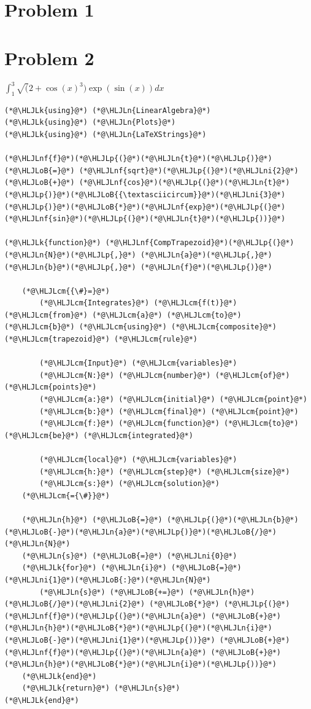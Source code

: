 \documentclass[12pt,a4paper]{article}
\newcommand{\HLJLk}[1]{\textcolor[RGB]{148,91,176}{\textbf{#1}}}
\newcommand{\HLJLn}[1]{#1}
\newcommand{\HLJLnf}[1]{\textcolor[RGB]{66,102,213}{#1}}
\newcommand{\HLJLni}[1]{\textcolor[RGB]{59,151,46}{#1}}
\newcommand{\HLJLoB}[1]{\textcolor[RGB]{102,102,102}{\textbf{#1}}}
\newcommand{\HLJLp}[1]{#1}
\newcommand{\HLJLcm}[1]{\textcolor[RGB]{153,153,119}{\textit{#1}}}
\begin{document}
\section{Problem 1}
\section{Problem 2}
$\int_1^3 \sqrt(2+\cos(x)^3)\exp(\sin(x))dx$


\begin{lstlisting}
(*@\HLJLk{using}@*) (*@\HLJLn{LinearAlgebra}@*)
(*@\HLJLk{using}@*) (*@\HLJLn{Plots}@*)
(*@\HLJLk{using}@*) (*@\HLJLn{LaTeXStrings}@*)

(*@\HLJLnf{f}@*)(*@\HLJLp{(}@*)(*@\HLJLn{t}@*)(*@\HLJLp{)}@*) (*@\HLJLoB{=}@*) (*@\HLJLnf{sqrt}@*)(*@\HLJLp{(}@*)(*@\HLJLni{2}@*) (*@\HLJLoB{+}@*) (*@\HLJLnf{cos}@*)(*@\HLJLp{(}@*)(*@\HLJLn{t}@*)(*@\HLJLp{)}@*)(*@\HLJLoB{{\textasciicircum}}@*)(*@\HLJLni{3}@*)(*@\HLJLp{)}@*)(*@\HLJLoB{*}@*)(*@\HLJLnf{exp}@*)(*@\HLJLp{(}@*)(*@\HLJLnf{sin}@*)(*@\HLJLp{(}@*)(*@\HLJLn{t}@*)(*@\HLJLp{))}@*)

(*@\HLJLk{function}@*) (*@\HLJLnf{CompTrapezoid}@*)(*@\HLJLp{(}@*)(*@\HLJLn{N}@*)(*@\HLJLp{,}@*) (*@\HLJLn{a}@*)(*@\HLJLp{,}@*) (*@\HLJLn{b}@*)(*@\HLJLp{,}@*) (*@\HLJLn{f}@*)(*@\HLJLp{)}@*)

    (*@\HLJLcm{{\#}=}@*)
        (*@\HLJLcm{Integrates}@*) (*@\HLJLcm{f(t)}@*) (*@\HLJLcm{from}@*) (*@\HLJLcm{a}@*) (*@\HLJLcm{to}@*) (*@\HLJLcm{b}@*) (*@\HLJLcm{using}@*) (*@\HLJLcm{composite}@*) (*@\HLJLcm{trapezoid}@*) (*@\HLJLcm{rule}@*)

        (*@\HLJLcm{Input}@*) (*@\HLJLcm{variables}@*)
        (*@\HLJLcm{N:}@*) (*@\HLJLcm{number}@*) (*@\HLJLcm{of}@*) (*@\HLJLcm{points}@*)
        (*@\HLJLcm{a:}@*) (*@\HLJLcm{initial}@*) (*@\HLJLcm{point}@*)
        (*@\HLJLcm{b:}@*) (*@\HLJLcm{final}@*) (*@\HLJLcm{point}@*)
        (*@\HLJLcm{f:}@*) (*@\HLJLcm{function}@*) (*@\HLJLcm{to}@*) (*@\HLJLcm{be}@*) (*@\HLJLcm{integrated}@*)

        (*@\HLJLcm{local}@*) (*@\HLJLcm{variables}@*)
        (*@\HLJLcm{h:}@*) (*@\HLJLcm{step}@*) (*@\HLJLcm{size}@*)
        (*@\HLJLcm{s:}@*) (*@\HLJLcm{solution}@*)
    (*@\HLJLcm{={\#}}@*)

    (*@\HLJLn{h}@*) (*@\HLJLoB{=}@*) (*@\HLJLp{(}@*)(*@\HLJLn{b}@*)(*@\HLJLoB{-}@*)(*@\HLJLn{a}@*)(*@\HLJLp{)}@*)(*@\HLJLoB{/}@*)(*@\HLJLn{N}@*)
    (*@\HLJLn{s}@*) (*@\HLJLoB{=}@*) (*@\HLJLni{0}@*)
    (*@\HLJLk{for}@*) (*@\HLJLn{i}@*) (*@\HLJLoB{=}@*) (*@\HLJLni{1}@*)(*@\HLJLoB{:}@*)(*@\HLJLn{N}@*)
        (*@\HLJLn{s}@*) (*@\HLJLoB{+=}@*) (*@\HLJLn{h}@*)(*@\HLJLoB{/}@*)(*@\HLJLni{2}@*) (*@\HLJLoB{*}@*) (*@\HLJLp{(}@*)(*@\HLJLnf{f}@*)(*@\HLJLp{(}@*)(*@\HLJLn{a}@*) (*@\HLJLoB{+}@*) (*@\HLJLn{h}@*)(*@\HLJLoB{*}@*)(*@\HLJLp{(}@*)(*@\HLJLn{i}@*)(*@\HLJLoB{-}@*)(*@\HLJLni{1}@*)(*@\HLJLp{))}@*) (*@\HLJLoB{+}@*) (*@\HLJLnf{f}@*)(*@\HLJLp{(}@*)(*@\HLJLn{a}@*) (*@\HLJLoB{+}@*) (*@\HLJLn{h}@*)(*@\HLJLoB{*}@*)(*@\HLJLn{i}@*)(*@\HLJLp{))}@*)
    (*@\HLJLk{end}@*)
    (*@\HLJLk{return}@*) (*@\HLJLn{s}@*)
(*@\HLJLk{end}@*)


\end{lstlisting}
\end{document}
